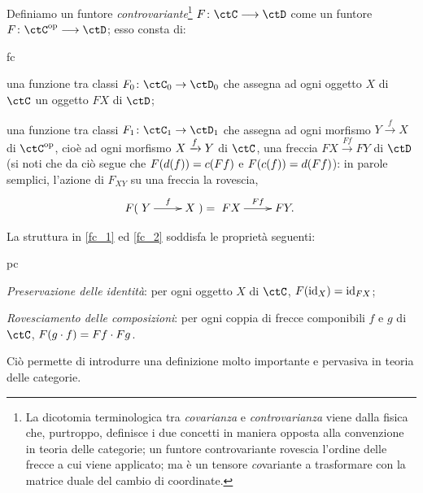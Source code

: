 \begin{definition}\label{def_funtore_contro}
 Definiamo un funtore \emph{controvariante}\footnote{La dicotomia terminologica tra \emph{covarianza} e \emph{controvarianza} viene dalla fisica che, purtroppo, definisce i due concetti in maniera opposta alla convenzione in teoria delle categorie; un funtore controvariante rovescia l'ordine delle frecce a cui viene applicato; ma è un tensore \emph{co}variante a trasformare con la matrice duale del cambio di coordinate.} \(F \colon \ctC \fun\ctD\) come un funtore \(F \colon \ctC^\op\fun\ctD\); esso consta di:
 \begin{enumtag}{fc}
  \item \label{fc_1} una funzione tra classi \(F_0 \colon \ctC_0\to\ctD_0\) che assegna ad ogni oggetto \(X\) di \(\ctC\) un oggetto \(FX\) di \(\ctD\);
  \item \label{fc_2} una funzione tra classi \(F_1 \colon \ctC_1\to\ctD_1\) che assegna ad ogni morfismo \(Y \xrightarrow{f} X\) di \(\ctC^\op\), cioè ad ogni morfismo \(X\xrightarrow{f} Y\) di \(\ctC\), una freccia \(FX \xrightarrow{Ff} FY\) di \(\ctD\) (si noti che da ciò segue che \(F(d(f))=c(Ff)\) e \(F(c(f))=d(Ff)\)): in parole semplici, l'azione di \(F_{XY}\) su una freccia la rovescia,
  \[F(\xymatrix{Y \ar[r]^f & X}) = \xymatrix{FX \ar[r]^{Ff} & FY.}\]
 \end{enumtag}
 La struttura in \ref{fc_1} ed \ref{fc_2} soddisfa le proprietà seguenti:
 \begin{enumtag}{pc}
  \item \label{pc_1} \emph{Preservazione delle identità}: per ogni oggetto \(X\) di \(\ctC\), \(F(\mathrm{id}_X)=\mathrm{id}_{FX}\);
  \item \label{pc_2} \emph{Rovesciamento delle composizioni}: per ogni coppia di frecce componibili \(f\) e \(g\) di \(\ctC\), \(F(g\cdot f)=Ff\cdot Fg\).
 \end{enumtag}
\end{definition}
Ciò permette di introdurre una definizione molto importante e pervasiva in teoria delle categorie.
